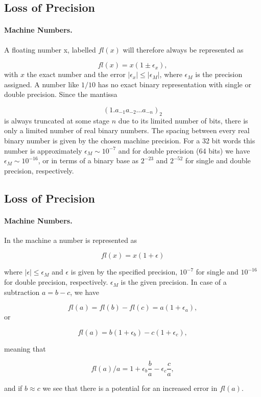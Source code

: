\documentclass[%
twoside,                 %
final,                   %
10pt]{article}
\newenvironment{paragraphadmon}[1][]{\paragraph{#1}}{}
\begin{document}
\subsection{Loss of Precision}


\begin{paragraphadmon}[Machine Numbers.]
A floating number x, labelled $fl(x)$ will therefore always be represented as

\begin{equation}
  fl(x) = x(1\pm \epsilon_x),
\end{equation}
with $x$ the exact number and the error $|\epsilon_x| \le |\epsilon_M|$, where
$\epsilon_M$ is the precision assigned. A number like $1/10$ has no exact binary representation
with single or double precision. Since the mantissa

\[
\left(1.a_{-1}a_{-2}\dots a_{-n}\right)_2
\]
is always truncated at some stage $n$ due to its limited number of bits, there is only a
limited number of real binary numbers. The spacing between every real binary number is given by the
chosen machine precision.
For a 32 bit words this number is approximately
$ \epsilon_M \sim 10^{-7}$ and for double precision (64 bits) we have
$ \epsilon_M \sim 10^{-16}$, or in terms of a binary base
as $2^{-23}$ and $2^{-52}$ for single and double precision, respectively.
\end{paragraphadmon}



\subsection{Loss of Precision}


\begin{paragraphadmon}[Machine Numbers.]
In the machine a number is represented as

\begin{equation}
  fl(x)= x(1+\epsilon)
\end{equation}

where $|\epsilon| \leq \epsilon_M$ and $\epsilon$ is given by the
specified precision, $10^{-7}$ for single and $10^{-16}$ for double
precision, respectively.
$\epsilon_M$ is the given precision.
In case of a subtraction $a=b-c$, we have

\begin{equation}
   fl(a)=fl(b)-fl(c) = a(1+\epsilon_a),
\end{equation}
or

\begin{equation}
   fl(a)=b(1+\epsilon_b)-c(1+\epsilon_c),
\end{equation}

meaning that

\begin{equation}
   fl(a)/a=1+\epsilon_b\frac{b}{a}- \epsilon_c\frac{c}{a},
\end{equation}

and if $b\approx c$ we see that there is a potential for an increased
error in $fl(a)$.
\end{paragraphadmon}
\end{document}
